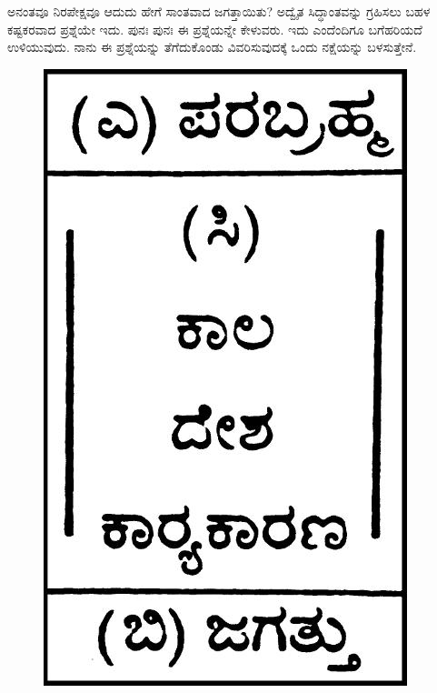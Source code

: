 ಅನಂತವೂ ನಿರಪೇಕ್ಷವೂ ಆದುದು ಹೇಗೆ ಸಾಂತವಾದ ಜಗತ್ತಾಯಿತು? ಅದ್ವೈತ ಸಿದ್ಧಾಂತವನ್ನು ಗ್ರಹಿಸಲು ಬಹಳ ಕಷ್ಟಕರವಾದ ಪ್ರಶ್ನೆಯೇ ಇದು. ಪುನಃ ಪುನಃ ಈ ಪ್ರಶ್ನೆಯನ್ನೇ ಕೇಳುವರು. ಇದು ಎಂದೆಂದಿಗೂ ಬಗೆಹರಿಯದೆ ಉಳಿಯುವುದು. ನಾನು ಈ ಪ್ರಶ್ನೆಯನ್ನು ತೆಗೆದುಕೊಂಡು ವಿವರಿಸುವುದಕ್ಕೆ ಒಂದು ನಕ್ಷೆಯನ್ನು ಬಳಸುತ್ತೇನೆ.
\noindent
\begin{figure}
  \includegraphics[scale=0.75]{images/001.jpg}
    \end{figure}
    
